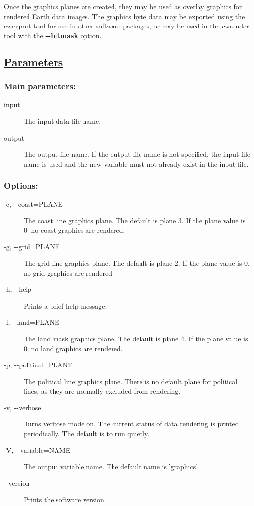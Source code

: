  Once the graphics planes are created, they may be used as overlay graphics for rendered Earth data images. The graphics byte data may be exported using the cwexport tool for use in other software packages, or may be used in the cwrender tool with the \textbf{-{-}bitmask}
 option. 
\subsection*{\underline{Parameters}}
\subsubsection*{Main parameters:}
\begin{description}
\item[ input ] The input data file name. 
\item[ output ] The output file name. If the output file name is not specified, the input file name is used and the new variable must not already exist in the input file. 

\end{description}
\subsubsection*{Options:}
\begin{description}
\item[ -c, -{-}coast=PLANE ] The coast line graphics plane. The default is plane 3. If the plane value is 0, no coast graphics are rendered. 
\item[ -g, -{-}grid=PLANE ] The grid line graphics plane. The default is plane 2. If the plane value is 0, no grid graphics are rendered. 
\item[ -h, -{-}help ] Prints a brief help message. 
\item[ -l, -{-}land=PLANE ] The land mask graphics plane. The default is plane 4. If the plane value is 0, no land graphics are rendered. 
\item[ -p, -{-}political=PLANE ] The political line graphics plane. There is no default plane for political lines, as they are normally excluded from rendering. 
\item[ -v, -{-}verbose ] Turns verbose mode on. The current status of data rendering is printed periodically. The default is to run quietly. 
\item[ -V, -{-}variable=NAME ] The output variable name. The default name is 'graphics'. 
\item[-{-}version]Prints the software version.

\end{description}
